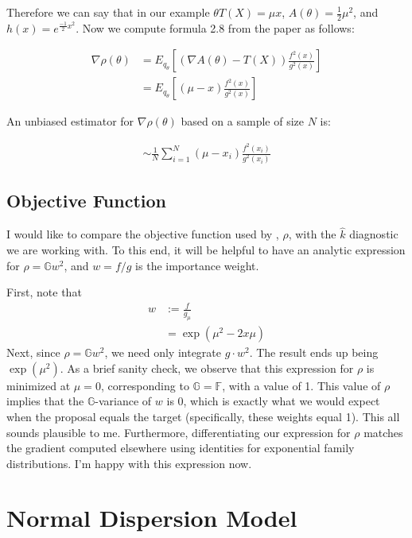 \documentclass{article}
\newcommand{\bG}{\mathbb{G}}
\newcommand{\bF}{\mathbb{F}}
\begin{document}
Therefore we can say that in our example $\theta T(X) = \mu x$, $A(\theta) = \frac{1}{2} \mu^2$, and $h(x) = e^{\frac{-1}{2}x^2}$. Now we compute formula 2.8 from the paper as follows:

\begin{align*}
\nabla \rho(\theta) &= E_{q_{\theta}} \left[ (\nabla A(\theta) - T(X)) \frac{f^{2}(x)}{g^{2}(x)} \right] \\
                    &= E_{q_{\theta}} \left[ (\mu - x) \frac{f^{2}(x)}{g^{2}(x)} \right] 
\end{align*}

An unbiased estimator for $\nabla \rho(\theta)$ based on a sample of size $N$ is:

\begin{align*}
\sim \frac{1}{N} \sum_{i=1}^{N} (\mu-x_i) \frac{f^{2}(x_i)}{g^{2}(x_i)}
\end{align*}

\subsection{Objective Function}

I would like to compare the objective function used by \citet{Aky21}, $\rho$, with the $\hat{k}$ diagnostic we are working with. To this end, it will be helpful to have an analytic expression for $\rho = \bG w^2$, and $w = f/g$ is the importance weight.

First, note that
%
\begin{align}
    w &:= \frac{f}{g_\mu}\\
    &= \exp(\mu^2 - 2 x \mu)
\end{align}
%
Next, since $\rho=\bG w^2$, we need only integrate $g \cdot w^2$. The result ends up being $\exp(\mu^2)$. As a brief sanity check, we observe that this expression for $\rho$ is minimized at $\mu=0$, corresponding to $\bG = \bF$, with a value of 1. This value of $\rho$ implies that the $\bG$-variance of $w$ is 0, which is exactly what we would expect when the proposal equals the target (specifically, these weights equal 1). This all sounds plausible to me. Furthermore, differentiating our expression for $\rho$ matches the gradient computed elsewhere using identities for exponential family distributions. I'm happy with this expression now.

\section{Normal Dispersion Model}
\end{document}

